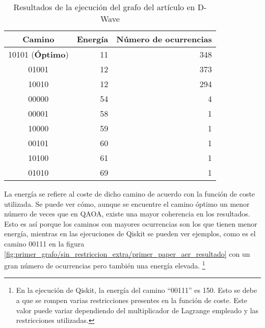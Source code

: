 \documentclass{article}
\begin{document}
\begin{table}[htbp]
  \centering
  \begin{tabular}{|c|r|r|}
    \hline
    \textbf{Camino} & \textbf{Energía} & \textbf{Número de ocurrencias} \\ \hline
    10101 (\textbf{Óptimo}) & 11 & 348 \\ \hline
    01001 & 12 & 373 \\ \hline
    10010 & 12 & 294 \\ \hline
    00000 & 54 &   4 \\ \hline
    00001 & 58 &   1 \\ \hline
    10000 & 59 &   1 \\ \hline
    00101 & 60 &   1 \\ \hline
    10100 & 61 &   1 \\ \hline
    01010 & 69 &   1 \\ \hline
  \end{tabular}
  \caption{Resultados de la ejecución del grafo del artículo en D-Wave}
  \label{tab:primer_paper_dwave_estadisticas}
\end{table}

La energía se refiere al coste de dicho camino de acuerdo con la función de coste utilizada. Se puede ver cómo, aunque se encuentre el camino óptimo un menor número de veces que en QAOA, existe una mayor coherencia en los resultados. Esto es así porque los caminos con mayores ocurrencias son los que tienen menor energía, mientras en las ejecuciones de Qiskit se pueden ver ejemplos, como es el camino 00111 en la figura \ref{fig:primer_grafo/sin_restriccion_extra/primer_paper_aer_resultado} con un gran número de ocurrencias pero también una energía elevada.
\footnote{En la ejecución de Qiskit, la energía del camino ``00111'' es 150. Esto se debe a que se rompen varias restricciones presentes en la función de coste. Este valor puede variar dependiendo del multiplicador de Lagrange empleado
  y las restricciones utilizadas.}
\end{document}
